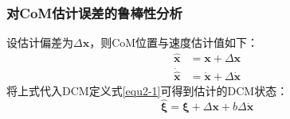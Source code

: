         \subsubsection{对CoM估计误差的鲁棒性分析}
            设估计偏差为$\varDelta \boldsymbol{x}$，则CoM位置与速度估计值如下：
            \begin{subequations}
                \begin{align}
                    \boldsymbol{\hat{x}}&=\boldsymbol{x}+\varDelta \boldsymbol{x} 
                    \label{equ2-21a}\\
                    \boldsymbol{\dot{\hat{x}}}&=\boldsymbol{\dot{x}}+\varDelta \boldsymbol{\dot{x}}
                    \label{equ2-21b}
                \end{align}
            \end{subequations}
            将上式代入DCM定义式\eqref{equ2-1}可得到估计的DCM状态：
            \begin{equation}
                \boldsymbol{\hat{\xi}}=\boldsymbol{\xi }+\varDelta \boldsymbol{x}+b\varDelta \boldsymbol{\dot{x}}
                \label{equ2-22}
            \end{equation}

